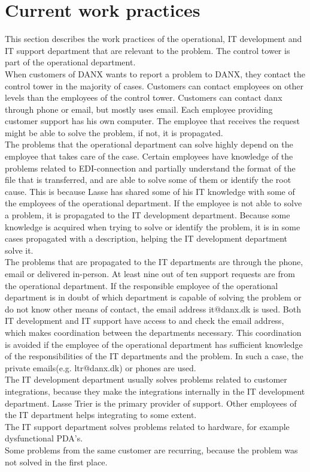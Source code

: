 \section{Current work practices}
\label{sec:workpractices}
This section describes the work practices of the operational, IT development and IT support department that are relevant to the problem. The control tower is part of the operational department.\\
When customers of DANX wants to report a problem to DANX, they contact the control tower in the majority of cases.\cite{gert004} Customers can contact employees on other levels than the employees of the control tower.\cite{gert007} Customers can contact danx through phone or email, but mostly uses email.\cite{gert020} Each employee providing customer support has his own computer.\cite{gert024} The employee that receives the request might be able to solve the problem, if not, it is propagated.\\
The problems that the operational department can solve highly depend on the employee that takes care of the case.\cite{lasse002} Certain employees have knowledge of the problems related to EDI-connection and partially understand the format of the file that is transferred, and are able to solve some of them or identify the root cause. This is because Lasse has shared some of his IT knowledge with some of the employees of the operational department.\cite{lasse006} If the employee is not able to solve a problem, it is propagated to the IT development department. Because some knowledge is acquired when trying to solve or identify the problem, it is in some cases propagated with a description, helping the IT development department solve it.\cite{gert006}\cite{lasse005}\\
The problems that are propagated to the IT departments are through the phone, email or delivered in-person.\cite{gert019} At least nine out of ten support requests are from the operational department.\cite{lasse001} If the responsible employee of the operational department is in doubt of which department is capable of solving the problem or do not know other means of contact, the email address it@danx.dk is used.\cite{lasse003} Both IT development and IT support have access to and check the email address, which makes coordination between the departments necessary.\cite{lasse004} This coordination is avoided if the employee of the operational department has sufficient knowledge of the responsibilities of the IT departments and the problem. In such a case, the private emails(e.g. ltr@danx.dk) or phones are used.\\
The IT development department usually solves problems related to customer integrations, because they make the integrations internally in the IT development department. Lasse Trier is the primary provider of support.\cite{lahib004} Other employees of the IT department helps integrating to some extent.\cite{lahib002}\cite{lahib003}\\
The IT support department solves problems related to hardware, for example dysfunctional PDA’s.\cite{lasse003}\\
Some problems from the same customer are recurring, because the problem was not solved in the first place.\cite{gert009}


